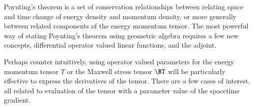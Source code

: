 %
%
Poynting's theorem is a set of conservation relationships between relating space and time change of energy density and momentum density, or more generally between related components of the energy momentum tensor.
The most powerful way of stating Poynting's theorem using geometric algebra requires a few new concepts, differential operator valued linear functions, and the adjoint.


Perhaps counter intuitively, using operator valued parameters for the energy momentum tensor \( T \) or the Maxwell stress tensor \( \BT \) will be particularly effective to express the derivatives of the tensor.  There are a few cases of interest, all related to evaluation of the tensor with a parameter value of the spacetime gradient.
\index{\(\BT(\spacegrad)\)}

